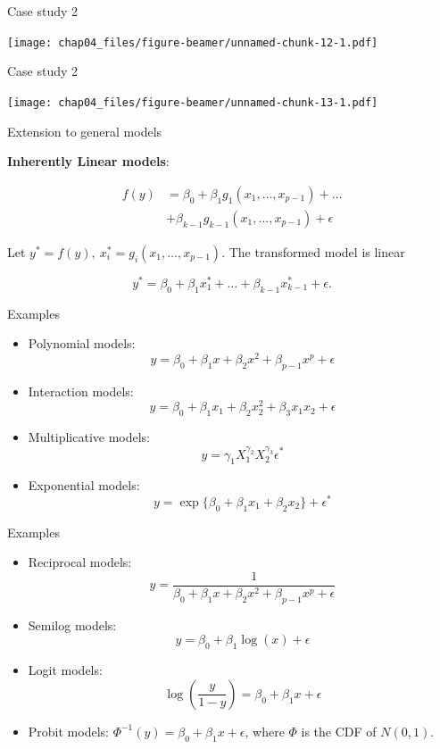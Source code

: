 \documentclass[ignorenonframetext,]{beamer}
\begin{document}
\begin{frame}{Case study 2}
\protect\hypertarget{case-study-2-1}{}

\texttt{[image: chap04\_files/figure-beamer/unnamed-chunk-12-1.pdf]}

\end{frame}

\begin{frame}{Case study 2}
\protect\hypertarget{case-study-2-2}{}

\texttt{[image: chap04\_files/figure-beamer/unnamed-chunk-13-1.pdf]}

\end{frame}

\begin{frame}{Extension to general models}
\protect\hypertarget{extension-to-general-models}{}

\textbf{Inherently Linear models}:

\[\begin{align}
f(y) &= \beta_0+\beta_1 g_1(x_1,\dots,x_{p-1})+\dots\\&+\beta_{k-1} g_{k-1}(x_1,\dots,x_{p-1})+\epsilon
\end{align}\]

Let \(y^*=f(y),\ x_i^*=g_i(x_1,\dots,x_{p-1})\). The transformed model
is linear

\[y^*=\beta_0+\beta_1 x_1^*+\dots+\beta_{k-1} x_{k-1}^{*}+\epsilon.\]

\end{frame}

\begin{frame}{Examples}
\protect\hypertarget{examples}{}

\begin{itemize}
\item
  Polynomial models:
  \[y = \beta_0+\beta_1x+\beta_2x^2+\beta_{p-1}x^p+\epsilon\]
\item
  Interaction models:
  \[y = \beta_0+\beta_1x_1+\beta_2x_2^2+\beta_{3}x_1x_2+\epsilon\]
\item
  Multiplicative models:
  \[y = \gamma_1X_1^{\gamma_2}X_2^{\gamma_3}\epsilon^*\]
\item
  Exponential models:
  \[y = \exp\{\beta_0+\beta_1x_1+\beta_2x_2\}+\epsilon^*\]
\end{itemize}

\end{frame}

\begin{frame}{Examples}
\protect\hypertarget{examples-1}{}

\begin{itemize}
\item
  Reciprocal models:
  \[y=\frac{1}{\beta_0+\beta_1x+\beta_2x^2+\beta_{p-1}x^p+\epsilon}\]
\item
  Semilog models: \[y = \beta_0+\beta_1\log(x)+\epsilon\]
\item
  Logit models:
  \[\log\left(\frac{y}{1-y}\right) = \beta_0+\beta_1 x+\epsilon\]
\item
  Probit models: \(\Phi^{-1}(y) = \beta_0+\beta_1 x+\epsilon\), where
  \(\Phi\) is the CDF of \(N(0,1)\).
\end{itemize}

\end{frame}
\end{document}
